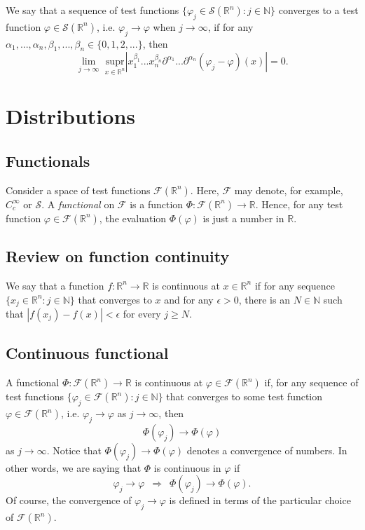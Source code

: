 \documentclass[aps,prl,twocolumn,groupedaddress]{revtex4-2}
\newcommand{\NN}{\mathbb{N}}
\newcommand{\RR}{\mathbb{R}}
\newcommand{\supr}[2]{\underset{#1}{\text{supr}}}
\begin{document}
We say that a sequence of test functions $\{\varphi_j \in \mathcal{S}(\RR^n) : j\in \NN\}$ converges to a test function $\varphi\in \mathcal{S}(\RR^n)$, i.e. $\varphi_j\to \varphi$ when $j\to \infty$, if for any $\alpha_1,...,\alpha_n,\beta_1,...,\beta_n\in \{0,1,2,...\}$, then 
$$
\lim_{j\to \infty}\,\, 
\supr{x\in \RR^n}\, 
\left|
x_1^{\beta_1}
...
x_n^{\beta_n}
\partial^{\alpha_1}
...
\partial^{\alpha_n}
(\varphi_j-\varphi)
(x)
\right| 
= 
0.
$$


\section{Distributions}

\subsection{Functionals}

Consider a space of test functions $\mathcal{F}(\RR^n)$.
Here, $\mathcal{F}$ may denote, for example, $C_c^{\infty}$ or $\mathcal{S}$.
A {\em functional} on $\mathcal{F}$ is a function $\Phi:\mathcal{F}(\RR^n)\to \RR$.
Hence, for any test function $\varphi\in \mathcal{F}(\RR^n)$, the evaluation $\Phi(\varphi)$ is just a number in $\RR$.

\subsection{Review on function continuity}

We say that a function $f:\RR^n\to \RR$ is continuous at $x\in \RR^n$ if for any sequence $\{x_j\in \RR^n:j\in \NN\}$ that converges to $x$ and for any $\epsilon>0$, there is an $N\in \NN$ such that $|f(x_j)-f(x)|<\epsilon$ for every $j\geq N$.

\subsection{Continuous functional}

A functional $\Phi:\mathcal{F}(\RR^n)\to \RR$ is continuous at $\varphi\in \mathcal{F}(\RR^n)$ if, for any sequence of test functions $\{\varphi_j\in \mathcal{F}(\RR^n): j \in \NN\}$ that converges to some test function $\varphi\in \mathcal{F}(\RR^n)$, i.e. $\varphi_j \to \varphi$ as $j\to \infty$, then 
$$
\Phi(\varphi_j) \to \Phi(\varphi)
$$
as $j\to \infty$.
Notice that $\Phi(\varphi_j)\to \Phi(\varphi)$ denotes a convergence of numbers.
In other words, we are saying that $\Phi$ is continuous in $\varphi$ if
$$
\varphi_j \to \varphi 
\,\,\,
\Rightarrow
\,\,\,
\Phi(\varphi_j) \to \Phi(\varphi).
$$
Of course, the convergence of $\varphi_j \to \varphi$ is defined in terms of the particular choice of $\mathcal{F}(\RR^n)$.
\end{document}

